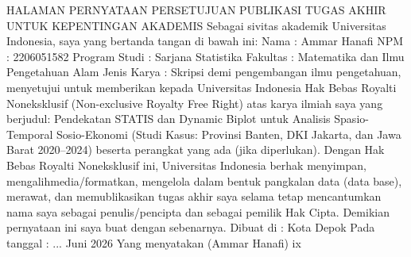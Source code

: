 HALAMAN PERNYATAAN PERSETUJUAN PUBLIKASI TUGAS AKHIR
UNTUK KEPENTINGAN AKADEMIS
Sebagai sivitas akademik Universitas Indonesia, saya yang bertanda tangan di bawah ini:
Nama : Ammar Hanafi
NPM : 2206051582
Program Studi : Sarjana Statistika
Fakultas : Matematika dan Ilmu Pengetahuan Alam
Jenis Karya : Skripsi
demi pengembangan ilmu pengetahuan, menyetujui untuk memberikan kepada Universitas
Indonesia Hak Bebas Royalti Noneksklusif (Non-exclusive Royalty Free Right) atas
karya ilmiah saya yang berjudul:
Pendekatan STATIS dan Dynamic Biplot untuk Analisis Spasio-Temporal Sosio-Ekonomi
(Studi Kasus: Provinsi Banten, DKI Jakarta, dan Jawa Barat 2020–2024)
beserta perangkat yang ada (jika diperlukan). Dengan Hak Bebas Royalti Noneksklusif ini,
Universitas Indonesia berhak menyimpan, mengalihmedia/formatkan, mengelola dalam
bentuk pangkalan data (data base), merawat, dan memublikasikan tugas akhir saya selama
tetap mencantumkan nama saya sebagai penulis/pencipta dan sebagai pemilik Hak Cipta.
Demikian pernyataan ini saya buat dengan sebenarnya.
Dibuat di : Kota Depok
Pada tanggal : ... Juni 2026
Yang menyatakan
(Ammar Hanafi)
ix

